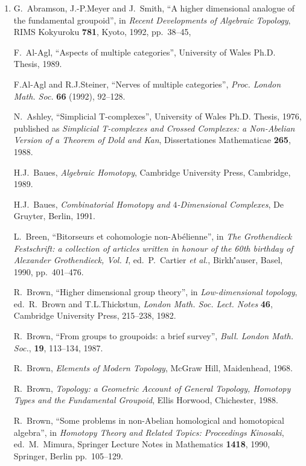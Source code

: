 \documentclass{article}
\begin{document}
\begin{enumerate}
\def\labelenumi{\arabic{enumi})}
\setcounter{enumi}{2}
\item
  G.\ Abramson, J.-P.Meyer and J.\ Smith, ``A higher dimensional analogue of
  the fundamental groupoid'', in \emph{Recent Developments of Algebraic
  Topology}, RIMS Kokyuroku \textbf{781}, Kyoto, 1992, pp.\ 38--45, 

  F.\ Al-Agl, ``Aspects of multiple categories'', University of Wales Ph.D.
  Thesis, 1989.

  F.Al-Agl and R.J.Steiner, ``Nerves of multiple categories'',
  \emph{Proc. London Math. Soc.} \textbf{66} (1992), 92--128.

  N.\ Ashley, ``Simplicial T-complexes'', University of Wales Ph.D. Thesis,
  1976, published as \textsl{Simplicial T-complexes and Crossed Complexes: a 
  Non-Abelian Version of
  a Theorem of Dold and Kan}, Dissertationes Mathematicae \textbf{265}, 1988.

  H.J.\ Baues, \emph{Algebraic Homotopy}, Cambridge University Press, Cambridge,
  1989.

  H.J.\ Baues, \emph{Combinatorial Homotopy and \(4\)-Dimensional
  Complexes}, De Gruyter, Berlin, 1991.

  L.\ Breen, ``Bitorseurs et cohomologie non-Abélienne'', in \emph{The
  Grothendieck Festschrift: a collection of articles written in honour
  of the 60th birthday of Alexander Grothendieck, Vol. I}, ed.\
  P.\ Cartier \textit{et al.}, Birkh\''auser, Basel, 1990, pp.\ 401--476.

  R.\ Brown, ``Higher dimensional group theory'', in \emph{Low-dimensional
  topology}, ed.~R.\ Brown and T.L.Thickstun, \emph{London Math. Soc.
  Lect. Notes} \textbf{46}, Cambridge University Press, 215--238, 1982.

  R.\ Brown, ``From groups to groupoids: a brief survey'', \emph{Bull.
  London Math. Soc.}, \textbf{19}, 113--134, 1987.

  R.\ Brown, \emph{Elements of Modern Topology}, McGraw Hill, Maidenhead,
  1968.
  
   R.\ Brown, \emph{Topology: a Geometric Account of General Topology,
  Homotopy Types and the Fundamental Groupoid}, Ellis Horwood,
  Chichester, 1988.

  R.\ Brown, ``Some problems in non-Abelian homological and homotopical
  algebra'', in \emph{Homotopy Theory and Related Topics: Proceedings
  Kinosaki}, ed.\ M.\ Mimura, Springer Lecture Notes in
  Mathematics \textbf{1418}, 1990, Springer, Berlin pp.\ 105--129.


\end{enumerate}
\end{document}
